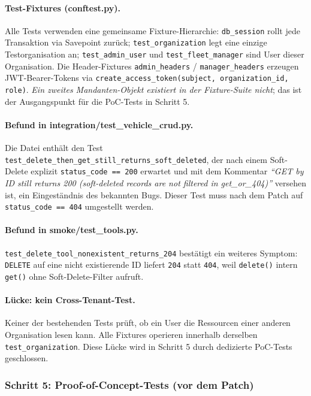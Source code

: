 \paragraph{Test-Fixtures (conftest.py).}
Alle Tests verwenden eine gemeinsame Fixture-Hierarchie:
\texttt{db\_session} rollt jede Transaktion via Savepoint zurück;
\texttt{test\_organization} legt eine einzige Testorganisation an;
\texttt{test\_admin\_user} und \texttt{test\_fleet\_manager} sind User dieser Organisation.
Die Header-Fixtures \texttt{admin\_headers} / \texttt{manager\_headers} erzeugen
JWT-Bearer-Tokens via \texttt{create\_access\_token(subject, organization\_id, role)}.
\emph{Ein zweites Mandanten-Objekt existiert in der Fixture-Suite nicht}; das ist
der Ausgangspunkt für die PoC-Tests in Schritt 5.

\paragraph{Befund in integration/test\_vehicle\_crud.py.}
Die Datei enthält den Test \texttt{test\_delete\_then\_get\_still\_returns\_soft\_deleted},
der nach einem Soft-Delete explizit \texttt{status\_code == 200} erwartet und mit dem
Kommentar \emph{``GET by ID still returns 200 (soft-deleted records are not filtered
    in get\_or\_404)''} versehen ist, ein Eingeständnis des bekannten Bugs.
Dieser Test muss nach dem Patch auf \texttt{status\_code == 404} umgestellt werden.

\paragraph{Befund in smoke/test\_tools.py.}
\texttt{test\_delete\_tool\_nonexistent\_returns\_204} bestätigt ein weiteres Symptom:
\texttt{DELETE} auf eine nicht existierende ID liefert \texttt{204} statt \texttt{404},
weil \texttt{delete()} intern \texttt{get()} ohne Soft-Delete-Filter aufruft.

\paragraph{Lücke: kein Cross-Tenant-Test.}
Keiner der bestehenden Tests prüft, ob ein User die Ressourcen einer anderen
Organisation lesen kann. Alle Fixtures operieren innerhalb derselben
\texttt{test\_organization}. Diese Lücke wird in Schritt 5 durch dedizierte PoC-Tests
geschlossen.

\subsubsection{Schritt 5: Proof-of-Concept-Tests (vor dem Patch)}

